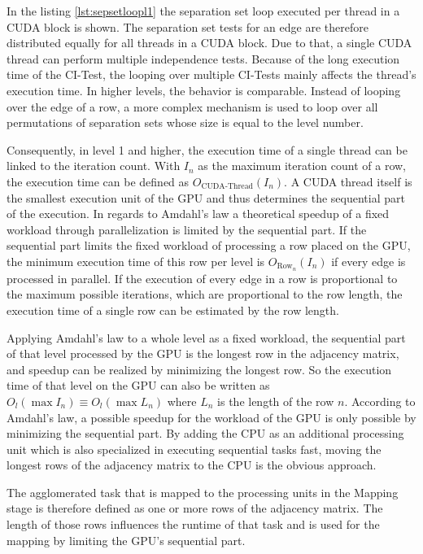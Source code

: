 In the listing \ref{lst:sepsetloopl1} the separation set loop executed per thread in a CUDA block is shown. The separation set tests for an edge are therefore distributed equally for all threads in a CUDA block. Due to that, a single CUDA thread can perform multiple independence tests. Because of the long execution time of the CI-Test, the looping over multiple CI-Tests mainly affects the thread's execution time. In higher levels, the behavior is comparable. Instead of looping over the edge of a row, a more complex mechanism is used to loop over all permutations of separation sets whose size is equal to the level number.

Consequently, in level 1 and higher, the execution time of a single thread can be linked to the iteration count. With $I_n$ as the maximum iteration count of a row, the execution time can be defined as $O_{\text{CUDA-Thread}}(I_n)$. A CUDA thread itself is the smallest execution unit of the GPU and thus determines the sequential part of the execution. In regards to Amdahl's law \cite{amdahlValiditySingleProcessor1967} a theoretical speedup of a fixed workload through parallelization is limited by the sequential part. If the sequential part limits the fixed workload of processing a row placed on the GPU, the minimum execution time of this row per level is $O_{\text{Row}_n}(I_n)$ if every edge is processed in parallel. If the execution of every edge in a row is proportional to the maximum possible iterations, which are proportional to the row length, the execution time of a single row can be estimated by the row length. %

Applying Amdahl's law to a whole level as a fixed workload, the sequential part of that level processed by the GPU is the longest row in the adjacency matrix, and speedup can be realized by minimizing the longest row. So the execution time of that level on the GPU can also be written as $O_{l}(\max I_n) \equiv O_{l}(\max L_n)$ where $L_n$ is the length of the row $n$. According to Amdahl's law, a possible speedup for the workload of the GPU is only possible by minimizing the sequential part. By adding the CPU as an additional processing unit which is also specialized in executing sequential tasks fast, moving the longest rows of the adjacency matrix to the CPU is the obvious approach.

The agglomerated task that is mapped to the processing units in the Mapping stage is therefore defined as one or more rows of the adjacency matrix. The length of those rows influences the runtime of that task and is used for the mapping by limiting the GPU's sequential part.

